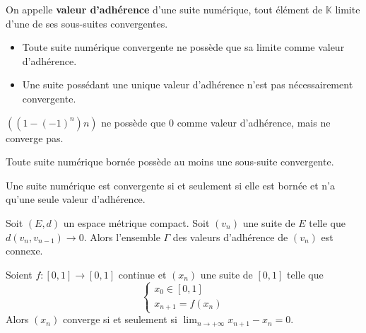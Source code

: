   \begin{definition}
    On appelle \textbf{valeur d'adhérence} d'une suite numérique, tout élément de $\mathbb{K}$ limite d'une de ses sous-suites convergentes.
  \end{definition}

  \begin{remark}
    \begin{itemize}
      \item Toute suite numérique convergente ne possède que sa limite comme valeur d'adhérence.
      \item Une suite possédant une unique valeur d'adhérence n'est pas nécessairement convergente.
    \end{itemize}
  \end{remark}

  \begin{example}
    $((1 - (-1)^n)n)$ ne possède que $0$ comme valeur d'adhérence, mais ne converge pas.
  \end{example}


  \begin{theorem}
    Toute suite numérique bornée possède au moins une sous-suite convergente.
  \end{theorem}


  \begin{proposition}
    Une suite numérique est convergente si et seulement si elle est bornée et n'a qu'une seule valeur d'adhérence.
  \end{proposition}


  \begin{application}
    Soit $(E, d)$ un espace métrique compact. Soit $(v_n)$ une suite de $E$ telle que $d(v_n,v_{n-1}) \longrightarrow 0$. Alors l'ensemble $\Gamma$ des valeurs d'adhérence de $(v_n)$ est connexe.
  \end{application}

  \begin{corollary}
    Soient $f : [0, 1] \rightarrow [0, 1]$ continue et $(x_n)$ une suite de $[0, 1]$ telle que
    \[ \begin{cases} x_0 \in [0, 1] \\ x_{n+1} = f(x_n) \end{cases} \]
    Alors $(x_n)$ converge si et seulement si $\lim_{n \rightarrow +\infty } x_{n+1} - x_n = 0$.
  \end{corollary}

